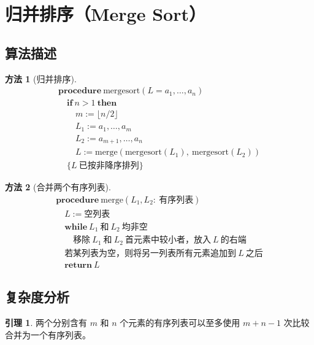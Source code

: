 \documentclass[UTF8,11pt,a4paper]{ctexbook}   %
\theoremstyle{definition}
\newtheorem{method}{方法}[section]
\newtheorem{lemma}{引理}[section]
\begin{document}
\section{归并排序（Merge Sort）}

\subsection{算法描述}

\begin{method}[归并排序]
\[
\begin{array}{l}
\textbf{procedure}\ \text{mergesort}(L = a_1, \dots, a_n)\\
\quad \textbf{if}\ n > 1\ \textbf{then}\\
\quad \quad m := \lfloor n/2 \rfloor\\
\quad \quad L_1 := a_1, \dots, a_m\\
\quad \quad L_2 := a_{m+1}, \dots, a_n\\
\quad \quad L := \text{merge}(\text{mergesort}(L_1),\ \text{mergesort}(L_2))\\
\quad \{L\ \text{已按非降序排列}\}
\end{array}
\]
\end{method}

\begin{method}[合并两个有序列表]
\[
\begin{array}{l}
\textbf{procedure}\ \text{merge}(L_1, L_2:\ \text{有序列表})\\
\quad L := \text{空列表}\\
\quad \textbf{while}\ L_1\ \text{和}\ L_2\ \text{均非空}\\
\quad \quad \text{移除}\ L_1\ \text{和}\ L_2\ \text{首元素中较小者，放入}\ L\ \text{的右端}\\
\quad \text{若某列表为空，则将另一列表所有元素追加到}\ L\ \text{之后}\\
\quad \textbf{return}\ L
\end{array}
\]
\end{method}

\subsection{复杂度分析}

\begin{lemma}
两个分别含有 $m$ 和 $n$ 个元素的有序列表可以至多使用 $m+n-1$ 次比较合并为一个有序列表。
\end{lemma}
\end{document}
